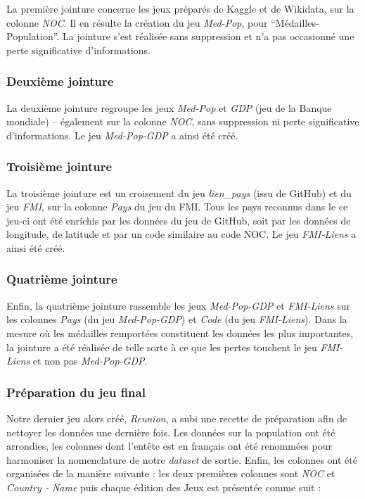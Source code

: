 \documentclass[hidelinks, 12pt]{article}
\begin{document}
La première jointure concerne les jeux préparés de Kaggle et de Wikidata, sur la colonne \emph{NOC}. Il en résulte la création du jeu \emph{Med-Pop}, pour \enquote{Médailles-Population}. La jointure s'est réalisée sans suppression et n'a pas occasionné une perte significative d'informations.

\subsubsection{Deuxième jointure}

La deuxième jointure regroupe les jeux \emph{Med-Pop} et \emph{GDP} (jeu de la Banque mondiale) -- également sur la colonne \emph{NOC}, sans suppression ni perte significative d'informations. Le jeu \emph{Med-Pop-GDP} a ainsi été créé.

\subsubsection{Troisième jointure}

La troisième jointure est un croisement du jeu \emph{lien\_pays} (issu de GitHub) et du jeu \emph{FMI}, sur la colonne \emph{Pays} du jeu du FMI. Tous les pays reconnus dans le ce jeu-ci ont été enrichis par les données du jeu de GitHub, soit par les données de longitude, de latitude et par un code similaire au code NOC. Le jeu \emph{FMI-Liens} a ainsi été créé.

\subsubsection{Quatrième jointure}

Enfin, la quatrième jointure rassemble les jeux \emph{Med-Pop-GDP} et \emph{FMI-Liens} sur les colonnes \emph{Pays} (du jeu \emph{Med-Pop-GDP}) et \emph{Code} (du jeu \emph{FMI-Liens}). Dans la mesure où les médailles remportées constituent les données les plus importantes, la jointure a été réalisée de telle sorte à ce que les pertes touchent le jeu \emph{FMI-Liens} et non pas \emph{Med-Pop-GDP}.

\subsubsection{Préparation du jeu final}

Notre dernier jeu alors créé, \emph{Reunion}, a subi une recette de préparation afin de nettoyer les données une dernière fois. Les données sur la population ont été arrondies, les colonnes dont l'entête est en français ont été renommées pour harmoniser la nomenclature de notre \emph{dataset} de sortie. Enfin, les colonnes ont été organisées de la manière suivante : les deux premières colonnes sont \emph{NOC} et \emph{Country - Name} puis chaque édition des Jeux est présentée comme suit :
\end{document}
